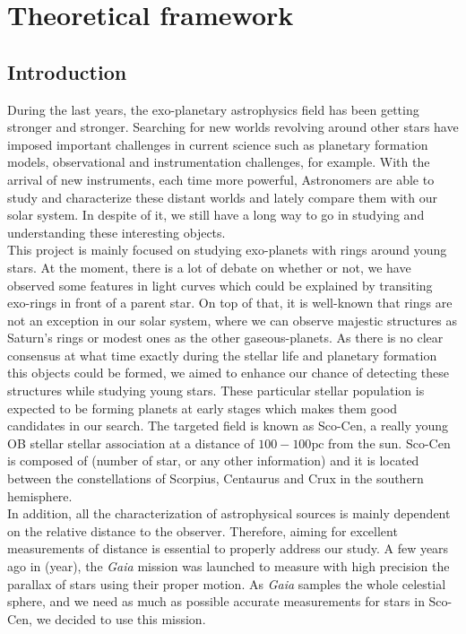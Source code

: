\chapter{ \textbf{Theoretical framework} }\label{ch:Theoretical}
\vspace{0.5cm} 

\section{Introduction}

During the last years, the exo-planetary astrophysics field has been getting stronger and stronger. Searching for new worlds revolving around other stars have imposed important challenges in current science such as planetary formation models, observational and instrumentation challenges, for example. With the arrival of new instruments, each time more powerful, Astronomers are able to study and characterize these distant worlds and lately compare them with our solar system. In despite of it, we still have a long way to go in studying and understanding these interesting objects.\\

This project is mainly focused on studying exo-planets with rings around young stars. At the moment, there is a lot of debate on whether or not, we have observed some features in light curves which could be explained by transiting exo-rings in front of a parent star. On top of that, it is well-known that rings are not an exception in our solar system, where we can observe majestic structures as Saturn's rings or modest ones as the other gaseous-planets. As there is no clear consensus at what time exactly during the stellar life and planetary formation this objects could be formed, we aimed to enhance our chance of detecting these structures while studying young stars. These particular stellar population is expected to be forming planets at early stages which makes them good candidates in our search. The targeted field is known as Sco-Cen, a really young OB stellar stellar association at a distance of $100-100\mathrm{pc}$ from the sun. Sco-Cen is composed of (number of star, or any other information) and it is located between the constellations of Scorpius, Centaurus and Crux in the southern hemisphere.\\ 

In addition, all the characterization of astrophysical sources is mainly dependent on the relative distance to the observer. Therefore, aiming for excellent measurements of distance is essential to properly address our study. A few years ago in (year), the \textit{Gaia} mission was launched to measure with high precision the parallax of stars using their proper motion. As \textit{Gaia} samples the whole celestial sphere, and we need as much as possible accurate measurements for stars in Sco-Cen, we decided to use this mission.\\

